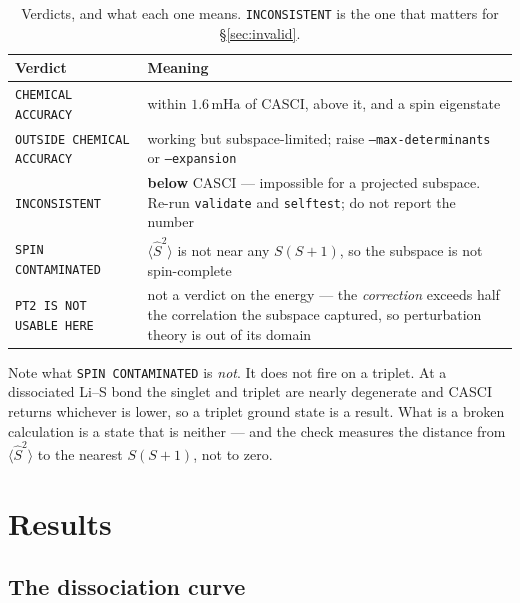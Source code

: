 \documentclass[11pt,a4paper]{article}
\newcommand{\mHa}{\ensuremath{\,\mathrm{mHa}}}
\newcommand{\Ssq}{\ensuremath{\langle \hat{S}^2 \rangle}}
\newcommand{\code}[1]{\texttt{\small #1}}
\begin{document}
\begin{table}[htbp]
\centering
\caption{Verdicts, and what each one means. \code{INCONSISTENT} is the one that
matters for \S\ref{sec:invalid}.}
\label{tab:verdicts}
\small
\begin{tabular}{>{\raggedright\arraybackslash}p{}>{\raggedright\arraybackslash}p{}}
\toprule
Verdict & Meaning \\
\midrule
\code{CHEMICAL ACCURACY} & within $1.6\mHa$ of CASCI, above it, and a spin
eigenstate \\
\code{OUTSIDE CHEMICAL ACCURACY} & working but subspace-limited; raise
\code{--max-determinants} or \code{--expansion} \\
\code{INCONSISTENT} & \textbf{below} CASCI --- impossible for a projected
subspace. Re-run \code{validate} and \code{selftest}; do not report the number \\
\code{SPIN CONTAMINATED} & $\Ssq$ is not near any $S(S+1)$, so the subspace is
not spin-complete \\
\code{PT2 IS NOT USABLE HERE} & not a verdict on the energy --- the
\emph{correction} exceeds half the correlation the subspace captured, so
perturbation theory is out of its domain \\
\bottomrule
\end{tabular}
\end{table}

Note what \code{SPIN CONTAMINATED} is \emph{not}. It does not fire on a triplet.
At a dissociated Li--S bond the singlet and triplet are nearly degenerate and
CASCI returns whichever is lower, so a triplet ground state is a result. What is
a broken calculation is a state that is neither --- and the check measures the
distance from $\Ssq$ to the nearest $S(S+1)$, not to zero.

\section{Results}

\subsection{The dissociation curve}
\end{document}
